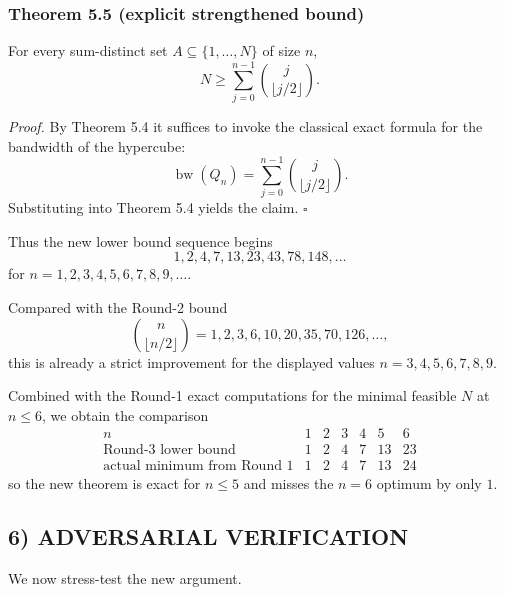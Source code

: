 \subsubsection*{Theorem 5.5 (explicit strengthened bound)}
For every sum-distinct set $A\subseteq \{1,\dots,N\}$ of size $n$,
\[
N\ge \sum_{j=0}^{n-1}\binom{j}{\lfloor j/2\rfloor}.
\]

\emph{Proof.}
By Theorem 5.4 it suffices to invoke the classical exact formula for the bandwidth of the hypercube:
\[
\operatorname{bw}(Q_n)=\sum_{j=0}^{n-1}\binom{j}{\lfloor j/2\rfloor}.
\]
Substituting into Theorem 5.4 yields the claim. \hfill$\square$

\medskip

Thus the new lower bound sequence begins
\[
1,2,4,7,13,23,43,78,148,\dots
\]
for $n=1,2,3,4,5,6,7,8,9,\dots$.

Compared with the Round-2 bound
\[
\binom{n}{\lfloor n/2\rfloor}=1,2,3,6,10,20,35,70,126,\dots,
\]
this is already a strict improvement for the displayed values $n=3,4,5,6,7,8,9$.

Combined with the Round-1 exact computations for the minimal feasible $N$ at $n\le 6$, we obtain the comparison
\[
\begin{array}{c|cccccc}
 n & 1 & 2 & 3 & 4 & 5 & 6\\ \hline
 \text{Round-3 lower bound} & 1 & 2 & 4 & 7 & 13 & 23\\
 \text{actual minimum from Round 1} & 1 & 2 & 4 & 7 & 13 & 24
\end{array}
\]
so the new theorem is exact for $n\le 5$ and misses the $n=6$ optimum by only $1$.

\subsection{6) ADVERSARIAL VERIFICATION}

We now stress-test the new argument.

